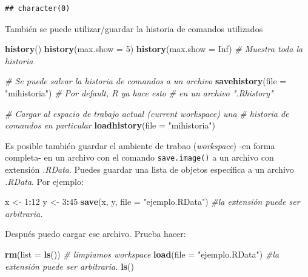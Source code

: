 \documentclass[]{article}
\newenvironment{Shaded}{\begin{snugshade}}{\end{snugshade}}
\newcommand{\KeywordTok}[1]{\textcolor[rgb]{0.13,0.29,0.53}{\textbf{#1}}}
\newcommand{\DataTypeTok}[1]{\textcolor[rgb]{0.13,0.29,0.53}{#1}}
\newcommand{\DecValTok}[1]{\textcolor[rgb]{0.00,0.00,0.81}{#1}}
\newcommand{\StringTok}[1]{\textcolor[rgb]{0.31,0.60,0.02}{#1}}
\newcommand{\CommentTok}[1]{\textcolor[rgb]{0.56,0.35,0.01}{\textit{#1}}}
\newcommand{\OtherTok}[1]{\textcolor[rgb]{0.56,0.35,0.01}{#1}}
\newcommand{\OperatorTok}[1]{\textcolor[rgb]{0.81,0.36,0.00}{\textbf{#1}}}
\newcommand{\NormalTok}[1]{#1}
\begin{document}
\begin{verbatim}
## character(0)
\end{verbatim}

También se puede utilizar/guardar la historia de comandos utilizados

\begin{Shaded}
\begin{Highlighting}[]
\KeywordTok{history}\NormalTok{()}
\KeywordTok{history}\NormalTok{(}\DataTypeTok{max.show =} \DecValTok{5}\NormalTok{)}
\KeywordTok{history}\NormalTok{(}\DataTypeTok{max.show =} \OtherTok{Inf}\NormalTok{) }\CommentTok{# Muestra toda la historia}

\CommentTok{# Se puede salvar la historia de comandos a un archivo}
\KeywordTok{savehistory}\NormalTok{(}\DataTypeTok{file =} \StringTok{"mihistoria"}\NormalTok{) }\CommentTok{# Por default, R ya hace esto }
\CommentTok{# en un archivo ".Rhistory"}

\CommentTok{# Cargar al espacio de trabajo actual (current workspace) una }
\CommentTok{# historia de comandos en particular}
\KeywordTok{loadhistory}\NormalTok{(}\DataTypeTok{file =} \StringTok{"mihistoria"}\NormalTok{)}
\end{Highlighting}
\end{Shaded}

Es posible también guardar el ambiente de trabao (\emph{workspace}) -en
forma completa- en un archivo con el comando \texttt{save.image()} a un
archivo con extensión \emph{.RData}. Puedes guardar una lista de objetos
específica a un archivo \emph{.RData}. Por ejemplo:

\begin{Shaded}
\begin{Highlighting}[]
\NormalTok{x <-}\StringTok{ }\DecValTok{1}\OperatorTok{:}\DecValTok{12}
\NormalTok{y <-}\StringTok{ }\DecValTok{3}\OperatorTok{:}\DecValTok{45}
\KeywordTok{save}\NormalTok{(x, y, }\DataTypeTok{file =} \StringTok{"ejemplo.RData"}\NormalTok{) }\CommentTok{#la extensión puede ser arbitraria.}
\end{Highlighting}
\end{Shaded}

Después puedo cargar ese archivo. Prueba hacer:

\begin{Shaded}
\begin{Highlighting}[]
\KeywordTok{rm}\NormalTok{(}\DataTypeTok{list =} \KeywordTok{ls}\NormalTok{()) }\CommentTok{# limpiamos workspace}
\KeywordTok{load}\NormalTok{(}\DataTypeTok{file =} \StringTok{"ejemplo.RData"}\NormalTok{) }\CommentTok{#la extensión puede ser arbitraria.}
\KeywordTok{ls}\NormalTok{()}
\end{Highlighting}
\end{Shaded}
\end{document}

